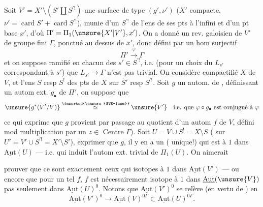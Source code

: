 Soit $V'=X'\setminus(S'\amalg S^{\prime!})$ une surface
  de type $(g',\nu')$
($X'$ compacte, $\nu'=\operatorname{card} S'+\operatorname{card} S^{\prime!}$),
munie d'un  $S^{\prime!}$ de l'ens de ses pts à l'infini
et d'un pt base $x'$, d'où $\Pi'=\Pi_1(\unsure{X'|V'},x')$.
On a donné un rev. galoisien  de $V'$ de groupe
fini $\Gamma$, ponctué au dessus de $x'$, donc défini par un hom surjectif
\[
\Pi'\xrightarrow{\varphi}\Gamma
\]
et on suppose  ramifié en chacun des $s'\in S^{\prime!}$,
i.e. (pour un choix du   $L_{s'}$
correspondant à $s'$) que $L_{s'}\to\Gamma$ n'est pas trivial.
On considère  compactifié  $X$ de $V$,
et l'ens $S$ resp $S^!$ des pts de $X$ sur $S'$ resp $S^{\prime!}$.
Soit $g$ un autom. de , définissant un autom ext.
$g_\bullet$ de $\Pi'$, on suppose que
\[
\unsure{g^*(V'/V)}\overset{\text{\inserted{\unsure{$V$-isom}}}}{\simeq}\unsure{V'}
\quad\text{i.e. que }\varphi\circ g_\bullet\text{ est conjugué à }\varphi
\]
\unsure{(|\{}ce qui exprime que $g$ provient par passage au quotient d'un autom $f$ de $V$,
défini mod multiplication par un 
$z\in$ Centre $\Gamma$).
Soit $U=V\cup S^!=X\setminus S$ ( sur
$U'=V'\cup S^{\prime!}=X'\setminus S'$),
  exprimer que
 
$g$, il y en a un ( unique!) qui est 
 à $1$ dans $\underline{\mathrm{Aut}}(U)$ --- i.e. qui induit
l'autom ext. trivial de $\Pi_1(U)$. On aimerait


prouver que ce sont exactement ceux qui  
isotopes à $1$ dans $\underline{\mathrm{Aut}}(V')$ --- ou encore que pour un tel $f$,
$f$ est nécessairement isotope à $1$ dans $\underline{\mathrm{Aut}}(\unsure{V})$
 pas seulement dans $\underline{\mathrm{Aut}}(U)^0$.
Notons  que
$\underline{\mathrm{Aut}}(V')^0$ se relève (en vertu de ) en
\[
\underline{\mathrm{Aut}}(V')^0\longrightarrow
\underline{\mathrm{Aut}}(V)^{0\Gamma}\subset
\underline{\mathrm{Aut}}(U)^{0\Gamma}.
\]

